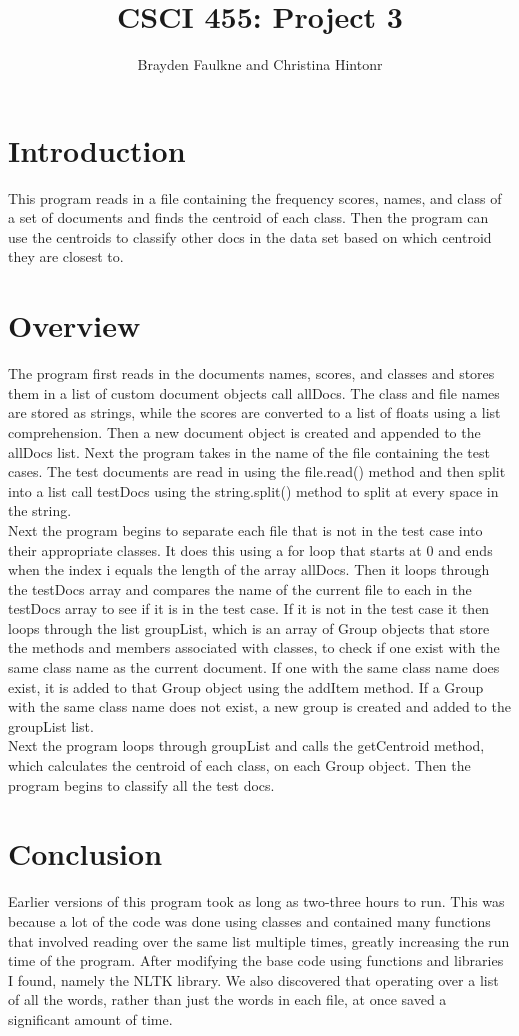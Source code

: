 \documentclass[12pt]{article}
\author{Brayden Faulkne and Christina Hintonr}
\title{CSCI 455: Project 3}
\begin{document}
\maketitle
\section{Introduction}
\indent This program reads in a file containing the frequency scores, names, and class of a set of documents and finds the centroid of each class. Then the program can use the centroids to classify other docs in the data set based on which centroid they are closest to. 
\section{Overview}
\indent The program first reads in the documents names, scores, and classes and stores them in a list of custom document objects call allDocs. The class and file names are stored as strings, while the scores are converted to a list of floats using a list comprehension. Then a new document object is created and appended to the allDocs list. Next the program takes in the name of the file containing the test cases. The test documents are read in using the file.read() method and then split into a list call testDocs using the string.split() method to split at every space in the string. \\
\indent Next the program begins to separate each file that is not in the test case into their appropriate classes. It does this using a for loop that starts at 0 and ends when the index i equals the length of the array allDocs. Then it loops through the testDocs array and compares the name of the current file to each in the testDocs array to see if it is in the test case. If it is not in the test case it then loops through the list groupList, which is an array of Group objects that store the methods and members associated with classes, to check if one exist with the same class name as the current document. If one with the same class name does exist, it is added to that Group object using the addItem method. If a Group with the same class name does not exist, a new group is created and added to the groupList list. \\
\indent Next the program loops through groupList and calls the getCentroid method, which calculates the centroid of each class, on each Group object. Then the program begins to classify all the test docs. 

\section{Conclusion} 
Earlier versions of this program took as long as two-three hours to run. This was because a lot of the code was done using classes and contained many functions that involved reading over the same list multiple times, greatly increasing the run time of the program. After modifying the base code using functions and libraries I found, namely the NLTK library. We also discovered that operating over a list of all the words, rather than just the words in each file, at once saved a significant amount of time.
\end{document}
